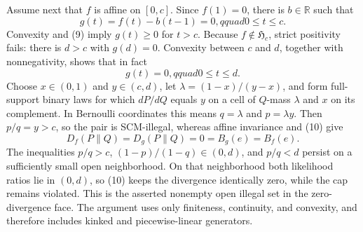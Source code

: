 Assume next that \(f\) is affine on \([0,c]\).  Since \(f(1)=0\), there is \(b\in\mathbb R\) such that
\[
 g(t)=f(t)-b(t-1)=0,qquad 0\le t\le c. \tag{9}
\]
Convexity and (9) imply \(g(t)\ge0\) for \(t>c\).  Because \(f\notin\mathfrak H_c\), strict positivity fails: there is \(d>c\) with \(g(d)=0\).  Convexity between \(c\) and \(d\), together with nonnegativity, shows that in fact
\[
 g(t)=0,qquad 0\le t\le d. \tag{10}
\]
Choose \(x\in(0,1)\) and \(y\in(c,d)\), let \(\lambda=(1-x)/(y-x)\), and form full-support binary laws for which \(dP/dQ\) equals \(y\) on a cell of \(Q\)-mass \(\lambda\) and \(x\) on its complement.  In Bernoulli coordinates this means \(q=\lambda\) and \(p=\lambda y\).  Then \(p/q=y>c\), so the pair is SCM-illegal, whereas affine invariance and (10) give
\[
 D_f(P\|Q)=D_g(P\|Q)=0=B_g(e)=B_f(e).
\]
The inequalities \(p/q>c\), \((1-p)/(1-q)\in(0,d)\), and \(p/q<d\) persist on a sufficiently small open neighborhood.  On that neighborhood both likelihood ratios lie in \((0,d)\), so (10) keeps the divergence identically zero, while the cap remains violated.  This is the asserted nonempty open illegal set in the zero-divergence face.  The argument uses only finiteness, continuity, and convexity, and therefore includes kinked and piecewise-linear generators.
